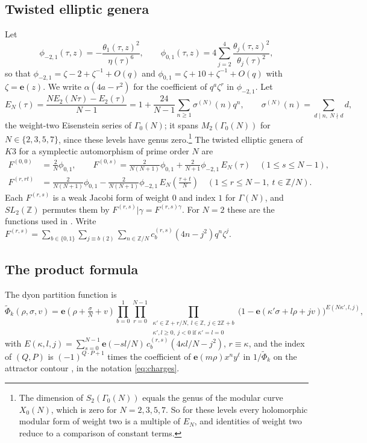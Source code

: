 \documentclass[11pt]{amsart}
\numberwithin{equation}{section}
\theoremstyle{plain}
\theoremstyle{remark}
\newcommand{\Z}{\mathbb{Z}}
\newcommand{\e}{\mathbf{e}}
\newcommand{\pmi}{\phi_{-2,1}}
\newcommand{\pz}{\phi_{0,1}}
\newcommand{\tPhi}{\widetilde{\Phi}}
\begin{document}
\subsection{Twisted elliptic genera}
Let\[\pmi(\tau,z)=-\frac{\theta_1(\tau,z)^2}{\eta(\tau)^6},\qquad \pz(\tau,z)=4\sum_{j=2}^4\frac{\theta_j(\tau,z)^2}{\theta_j(\tau)^2},\]so that $\pmi=\zeta-2+\zeta^{-1}+O(q)$ and $\pz=\zeta+10+\zeta^{-1}+O(q)$ with $\zeta=\e(z)$. We write $\alpha(4a-r^2)$ for the coefficient of $q^a\zeta^r$ in $\pmi$. Let
\begin{equation}\label{eq:EN}
E_N(\tau)=\frac{NE_2(N\tau)-E_2(\tau)}{N-1}=1+\frac{24}{N-1}\sum_{n\ge1}\sigma^{(N)}(n)q^n,\qquad \sigma^{(N)}(n)=\sum_{d\mid n,\ N\nmid d}d,
\end{equation}
the weight-two Eisenstein series of $\Gamma_0(N)$; it spans $M_2(\Gamma_0(N))$ for $N\in\{2,3,5,7\}$, since these levels have genus zero.\footnote{The dimension of $S_2(\Gamma_0(N))$ equals the genus of the modular curve $X_0(N)$, which is zero for $N=2,3,5,7$. So for these levels every holomorphic modular form of weight two is a multiple of $E_N$, and identities of weight two reduce to a comparison of constant terms.}
The twisted elliptic genera of $K3$ for a symplectic automorphism of prime order $N$ are \cite{JS06,DJS06}
\begin{equation}\label{eq:genera}
\begin{aligned}
F^{(0,0)}&=\tfrac{2}{N}\pz,\qquad F^{(0,s)}=\tfrac{2}{N(N+1)}\pz+\tfrac{2}{N+1}\pmi\,E_N(\tau)\quad(1\le s\le N-1),\\
F^{(r,rt)}&=\tfrac{2}{N(N+1)}\pz-\tfrac{2}{N(N+1)}\pmi\,E_N\!\left(\tfrac{\tau+t}{N}\right)\quad(1\le r\le N-1,\ t\in\Z/N).
\end{aligned}
\end{equation}
Each $F^{(r,s)}$ is a weak Jacobi form of weight $0$ and index $1$ for $\Gamma(N)$, and $SL_2(\Z)$ permutes them by $F^{(r,s)}|\gamma=F^{(r,s)\gamma}$. For $N=2$ these are the functions used in \cite{Bha26a}. Write $F^{(r,s)}=\sum_{b\in\{0,1\}}\sum_{j\equiv b\,(2)}\sum_{n\in\Z/N}c_b^{(r,s)}(4n-j^2)q^n\zeta^j$.

\subsection{The product formula}
The dyon partition function is \cite{DJS06}
\begin{equation}\label{eq:product}
\tPhi_k(\rho,\sigma,v)=\e\!\left(\rho+\tfrac{\sigma}{N}+v\right)\prod_{b=0}^{1}\prod_{r=0}^{N-1}\prod_{\substack{\kappa'\in\Z+r/N,\ l\in\Z,\ j\in2\Z+b\\ \kappa',l\ge0,\ j<0\text{ if }\kappa'=l=0}}\bigl(1-\e(\kappa'\sigma+l\rho+jv)\bigr)^{E(N\kappa',l,j)},
\end{equation}
with $E(\kappa,l,j)=\sum_{s=0}^{N-1}\e(-sl/N)\,c_b^{(r,s)}(4\kappa l/N-j^2)$, $r\equiv\kappa$, and the index of $(Q,P)$ is $(-1)^{Q\cdot P+1}$ times the coefficient of $\e(m\rho)x^ny^\ell$ in $1/\tPhi_k$ on the attractor contour \cite{JS06,DJS06,Sen08}, in the notation \eqref{eq:charges}.
\end{document}
